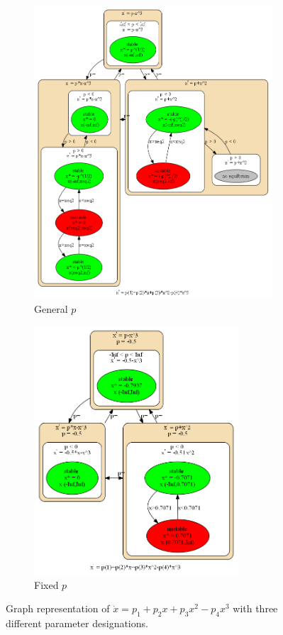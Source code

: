 \documentclass[12pt]{article}
\begin{document}
\begin{figure}[H]
\centering
\begin{subfigure}[b]{0.4\textwidth}
	\centering
	\includegraphics[width=3.5in]{mar24_graph_mpgen.png}
	\caption{General $p$}
\end{subfigure}
\qquad \qquad \qquad
\begin{subfigure}[b]{0.4\textwidth}
	\centering
	\includegraphics[width=3in]{mar24_graph_mpfp.png}
	\caption{Fixed $p$}
\end{subfigure}
\caption{Graph representation of $\dot{x}=p_1+p_2x+p_3x^2-p_4x^3$ with three different parameter designations.}
\label{mar24_graph_mp}
\end{figure}
\end{document}
